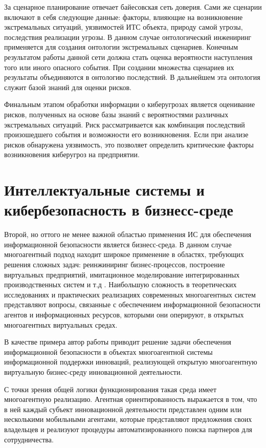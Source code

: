За сценарное планирование отвечает байесовская сеть доверия. Сами же сценарии включают в себя следующие данные:
факторы, влияющие на возникновение экстремальных ситуаций, уязвимостей ИТС объекта, природу самой угрозы,
последствия реализации угрозы. В данном случае онтологический инжениринг применяется для создания онтологии
экстремальных сценариев. Конечным результатом работы данной сети должна стать оценка вероятности наступления
того или иного опасного события. При создании множества сценариев их результаты объединяются в онтологию
последствий. В дальнейшем эта онтология служит базой знаний для оценки рисков.

Финальным этапом обработки информации о киберугрозах является оценивание рисков, полученных на основе базы
знаний с вероятностями различных экстремальных ситуаций. Риск рассматривается как комбинация последствий
произошедшего события и возможности его возникновения. Если при анализе рисков обнаружена уязвимость, это
позволяет определить критические факторы возникновения киберугроз на предприятии.

\section{Интеллектуальные системы и кибербезопасность в бизнесс-среде}
Второй, но оттого не менее важной областью применения ИС для обеспечения информационной безопасности
является бизнесс-среда. В данном случае многоагентный подход находит широкое применение в
областях, требующих решения сложных задач: реинжиниринг бизнес-процессов,
построение виртуальных предприятий, имитационное моделирование интегрированных производственных систем
и т.д \cite{mob}. Наибольшую сложность в теоретических исследованиях и практических реализациях современных
многоагентных систем представляют вопросы, связанные с обеспечением информационной безопасности агентов и информационных
ресурсов, которыми они оперируют, в открытых многоагентных виртуальных средах.

В качестве примера автор работы \cite{mob} приводит решение задачи
обеспечения информационной безопасности в объектах многоагентной
системы информационной поддержки инноваций, реализующей
открытую многоагентную виртуальную бизнес-среду инновационной деятельности.

С точки зрения общей логики функционирования такая среда имеет многоагентную реализацию.
Агентная ориентированность выражается в том, что в ней каждый субъект инновационной деятельности
представлен одним или несколькими мобильными агентами, которые представляют предложения
своих владельцев и реализуют процедуры автоматизированного поиска партнеров для сотрудничества.

